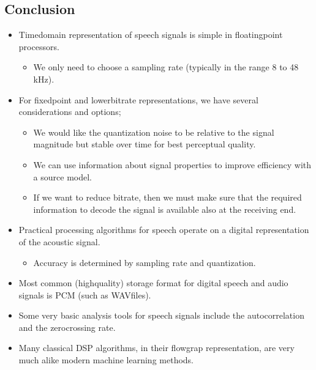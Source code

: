 \documentclass[letterpaper,10pt,english]{jupyterBook}
\begin{document}
\sphinxAtStartPar
{}


\subsection{Conclusion}
\label{\detokenize{Representations/Waveform:conclusion}}\begin{itemize}
\item {} 
\sphinxAtStartPar
Time\sphinxhyphen{}domain representation of speech signals is simple in
floating\sphinxhyphen{}point processors.
\begin{itemize}
\item {} 
\sphinxAtStartPar
We only need to choose a sampling rate (typically in the range 8
to 48 kHz).

\end{itemize}

\item {} 
\sphinxAtStartPar
For fixed\sphinxhyphen{}point and lower\sphinxhyphen{}bitrate representations, we have several
considerations and options;
\begin{itemize}
\item {} 
\sphinxAtStartPar
We would like the quantization noise to be relative to the
signal magnitude but stable over time for best perceptual
quality.

\item {} 
\sphinxAtStartPar
We can use information about signal properties to improve
efficiency with a source model.

\item {} 
\sphinxAtStartPar
If we want to reduce bit\sphinxhyphen{}rate, then we must make sure that the
required information to decode the signal is available also at
the receiving end.

\end{itemize}

\item {} 
\sphinxAtStartPar
Practical processing algorithms for speech operate on a digital
representation of the acoustic signal.
\begin{itemize}
\item {} 
\sphinxAtStartPar
Accuracy is determined by sampling rate and quantization.

\end{itemize}

\item {} 
\sphinxAtStartPar
Most common (high\sphinxhyphen{}quality) storage format for digital speech and
audio signals is PCM (such as WAV\sphinxhyphen{}files).

\item {} 
\sphinxAtStartPar
Some very basic analysis tools for speech signals include the
autocorrelation and the zero\sphinxhyphen{}crossing rate.

\item {} 
\sphinxAtStartPar
Many classical DSP algorithms, in their flow\sphinxhyphen{}grap representation,
are very much alike modern machine learning methods.

\end{itemize}
\end{document}
